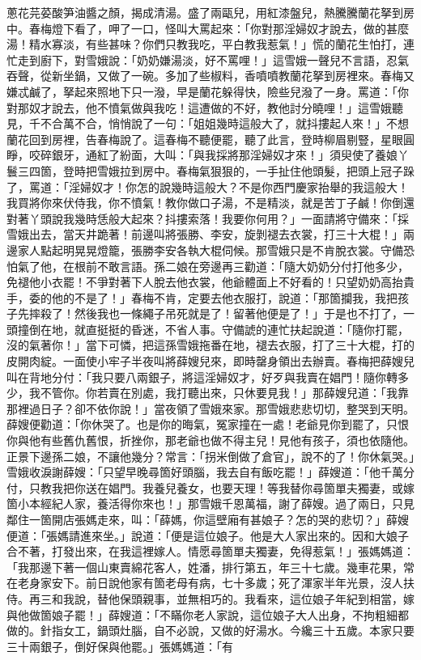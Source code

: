 蔥花芫荽酸笋油醬之顏，揭成清湯。盛了兩甌兒，用紅漆盤兒，熱騰騰蘭花拏到房中。春梅燈下看了，呷了一口，怪叫大罵起來：「你對那淫婦奴才說去，做的甚麼湯！精水寡淡，有些甚味？你們只教我吃，平白教我惹氣！」慌的蘭花生怕打，連忙走到廚下，對雪娥說：「奶奶嫌湯淡，好不罵哩！」這雪娥一聲兒不言語，忍氣吞聲，從新坐鍋，又做了一碗。多加了些椒料，香噴噴教蘭花拏到房裡來。春梅又嫌忒鹹了，拏起來照地下只一潑，早是蘭花躲得快，險些兒潑了一身。罵道：「你對那奴才說去，他不憤氣做與我吃！這遭做的不好，教他討分曉哩！」這雪娥聽見，千不合萬不合，悄悄說了一句：「姐姐幾時這般大了，就抖摟起人來！」不想蘭花回到房裡，告春梅說了。這春梅不聽便罷，聽了此言，登時柳眉剔豎，星眼圓睜，咬碎銀牙，通紅了紛面，大叫：「與我採將那淫婦奴才來！」須臾使了養娘丫鬟三四箇，登時把雪娥拉到房中。春梅氣狠狠的，一手扯住他頭髮，把頭上冠子跺了，罵道：「淫婦奴才！你怎的說幾時這般大？不是你西門慶家抬舉的我這般大！我買將你來伏侍我，你不憤氣！教你做口子湯，不是精淡，就是苦丁子鹹！你倒還對著丫頭說我幾時恁般大起來？抖摟索落！我要你何用？」一面請將守備來：「採雪娥出去，當天井跪著！前邊叫將張勝、李安，旋剝褪去衣裳，打三十大棍！」兩邊家人點起明晃晃燈籠，張勝李安各執大棍伺候。那雪娥只是不肯脫衣裳。守備恐怕氣了他，在根前不敢言語。孫二娘在旁邊再三勸道：「隨大奶奶分付打他多少，免褪他小衣罷！不爭對著下人脫去他衣裳，他爺體面上不好看的！只望奶奶高抬貴手，委的他的不是了！」春梅不肯，定要去他衣服打，說道：「那箇攔我，我把孩子先摔殺了！然後我也一條繩子吊死就是了！留著他便是了！」于是也不打了，一頭撞倒在地，就直挺挺的昏迷，不省人事。守備諕的連忙扶起說道：「隨你打罷，沒的氣著你！」當下可憐，把這孫雪娥拖番在地，褪去衣服，打了三十大棍，打的皮開肉綻。一面使小牢子半夜叫將薛嫂兒來，即時罄身領出去辦賣。春梅把薛嫂兒叫在背地分付：「我只要八兩銀子，將這淫婦奴才，好歹與我賣在娼門！隨你轉多少，我不管你。你若賣在別處，我打聽出來，只休要見我！」那薛嫂兒道：「我靠那裡過日子？卻不依你說！」當夜領了雪娥來家。那雪娥悲悲切切，整哭到天明。薛嫂便勸道：「你休哭了。也是你的晦氣，冤家撞在一處！老爺見你到罷了，只恨你與他有些舊仇舊恨，折挫你，那老爺也做不得主兒！見他有孩子，須也依隨他。正景下邊孫二娘，不讓他幾分？常言：「拐米倒做了倉官」，說不的了！你休氣哭。」雪娥收淚謝薛嫂：「只望早晚尋箇好頭腦，我去自有飯吃罷！」薛嫂道：「他千萬分付，只教我把你送在娼門。我養兒養女，也要天理！等我替你尋箇單夫獨妻，或嫁箇小本經紀人家，養活得你來也！」那雪娥千恩萬福，謝了薛嫂。過了兩日，只見鄰住一箇開店張媽走來，叫：「薛媽，你這壁廂有甚娘子？怎的哭的悲切？」薛嫂便道：「張媽請進來坐。」說道：「便是這位娘子。他是大人家出來的。因和大娘子合不著，打發出來，在我這裡嫁人。情愿尋箇單夫獨妻，免得惹氣！」張媽媽道：「我那邊下著一個山東賣綿花客人，姓潘，排行第五，年三十七歲。幾車花果，常在老身家安下。前日說他家有箇老母有病，七十多歲；死了渾家半年光景，沒人扶侍。再三和我說，替他保頭親事，並無相巧的。我看來，這位娘子年紀到相當，嫁與他做箇娘子罷！」薛嫂道：「不瞞你老人家說，這位娘子大人出身，不拘粗細都做的。針指女工，鍋頭灶腦，自不必說，又做的好湯水。今纔三十五歲。本家只要三十兩銀子，倒好保與他罷。」張媽媽道：「有